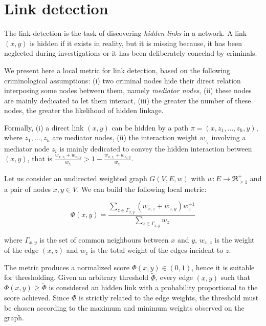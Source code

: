 \section{Link detection}
\label{sec:link-detection}

The link detection is the task of discovering \textit{hidden links} in a network. 
A link $(x,y)$ is hidden if it exists in reality, but it is missing because, it has been neglected during investigations or it has been deliberately concelad by criminals.

We present here a local metric for link detection, based on the following criminological assumptions: 
(i) two criminal nodes hide their direct relation interposing some nodes between them, namely \textit{mediator nodes}, 
(ii) these nodes are mainly dedicated to let them interact,
(iii) the greater the number of these nodes, the greater the likelihood of hidden linkage. 

Formally, 
(i) a direct link $(x,y)$ can be hidden by a path $\pi=(x,z_{1},\ldots,z_{h},y)$, where $z_{1},\ldots,z_{h}$ are mediator nodes,
(ii) the interaction weight $w_{z_{i}}$ involving a mediator node $z_{i}$ is mainly dedicated to convey the hidden interaction between $(x,y)$, that is $\frac{w_{x,z_{i}}+w_{z_{i},y}}{w_{z_{i}}} > 1- \frac{w_{x,z_{i}}+w_{z_{i},y}}{w_{z_{i}}}$.

Let us consider an undirected weighted graph $G(V,E,w)$ with $w:E\rightarrow\Re_{\geq1}^{+}$ and a pair of nodes $x,y\in V$.
We can build the following local metric:

\begin{equation}
\label{eqn:detection-local}
\Phi(x,y)=
\frac{\sum\limits_{z\in\Gamma_{x,y}}(w_{x,z}+w_{z,y})w_{z}^{-1}}
{\sum\limits_{z\in\Gamma_{x,y}}w_{z}}
\end{equation}

where 
$\Gamma_{x,y}$ is the set of common neighbours between $x$ and $y$,
$w_{x,z}$ is the weight of the edge $(x,z)$ and
$w_{z}$ is the total weight of the edges incident to $z$.

The metric produces a normalized score $\Phi(x,y)\in(0,1)$, hence it is suitable for thresholding.
Given an arbitrary threshold $\tilde{\Phi}$, every edge $(x,y)$ such that $\Phi(x,y)\geq\tilde{\Phi}$ is considered an hidden link with a probability proportional to the score achieved.
Since $\Phi$ is strictly related to the edge weights, the threshold must be chosen according to the maximum and minimum weights observed on the graph.

%

